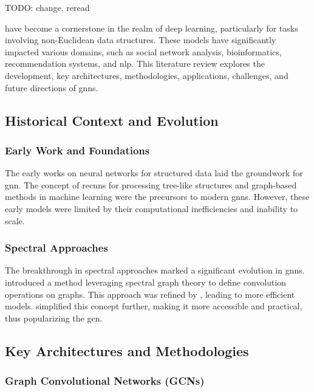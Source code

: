 TODO: change, reread

 have become a cornerstone in the realm of deep learning, particularly for tasks involving non-Euclidean data structures. These models have significantly impacted various domains, such as social network analysis, bioinformatics, recommendation systems, and \gls{nlp}. This literature review explores the development, key architectures, methodologies, applications, challenges, and future directions of \glspl{gnn}.

\subsection*{Historical Context and Evolution}

\subsubsection*{Early Work and Foundations}

The early works on neural networks for structured data laid the groundwork for \gls{gnn}. The concept of \glspl{recnn} for processing tree-like structures and graph-based methods in machine learning were the precursors to modern \glspl{gnn}. However, these early models were limited by their computational inefficiencies and inability to scale.

\subsubsection*{Spectral Approaches}

The breakthrough in spectral approaches marked a significant evolution in \glspl{gnn}. \cite{Bruna2013} introduced a method leveraging spectral graph theory to define convolution operations on graphs. This approach was refined by \cite{Defferrard2016}, leading to more efficient models. \cite{Kipf2017} simplified this concept further, making it more accessible and practical, thus popularizing the \gls{gcn}.

\subsection*{Key Architectures and Methodologies}

\subsubsection*{Graph Convolutional Networks (GCNs)}

